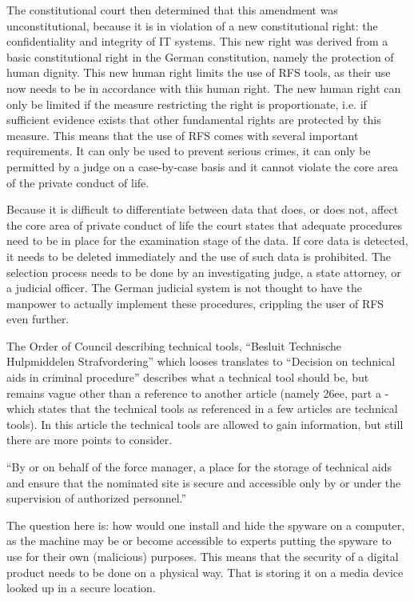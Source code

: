 \documentclass[11pt]{article} %
\begin{document}
The constitutional court then determined that this amendment was unconstitutional, because it is in violation of a new constitutional right: the confidentiality and integrity of IT systems.
This new right was derived from a basic constitutional right in the German constitution, namely the protection of human dignity.
This new human right limits the use of RFS tools, as their use now needs to be in accordance with this human right.
The new human right can only be limited if the measure restricting the right is proportionate, i.e. if sufficient evidence exists that other fundamental rights are protected by this measure.
This means that the use of RFS comes with several important requirements.
It can only be used to prevent serious crimes, it can only be permitted by a judge on a case-by-case basis and it cannot violate the core area of the private conduct of life.

Because it is difficult to differentiate between data that does, or does not, affect the core area of private conduct of life the court states that adequate procedures need to be in place for the examination stage of the data. If core data is detected, it needs to be deleted immediately and the use of such data is prohibited. The selection process needs to be done by an investigating judge, a state attorney, or a judicial officer. The German judicial system is not thought to have the manpower to actually implement these procedures, crippling the user of RFS even further.


The Order of Council describing technical tools, ``Besluit Technische Hulpmiddelen Strafvordering'' which looses translates to ``Decision on technical aids in criminal procedure'' \cite{besluit} describes what a technical tool should be, but remains vague other than a reference to another article (namely 26ee, part a - which states that the technical tools as referenced in a few articles are technical tools).
In this article the technical tools are allowed to gain information, but still there are more points to consider.

``By or on behalf of the force manager, a place for the storage of technical aids and ensure that the nominated site is secure and accessible only by or under the supervision of authorized personnel.'' %

The question here is: how would one install and hide the spyware on a computer, as the machine may be or become accessible to experts putting the spyware to use for their own (malicious) purposes.
This means that the security of a digital product needs to be done on a physical way.
That is storing it on a media device looked up in a secure location.
\end{document}
